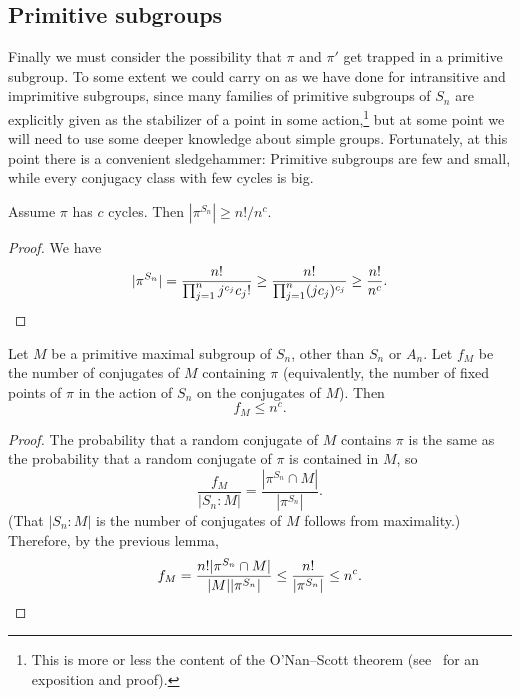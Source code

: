 \documentclass[ALCO,ThmDefs,Unicode,epreuves]{cedram}
\begin{document}
\subsection{Primitive subgroups} \label{subsec:primitive-subgroups}

Finally we must consider the possibility that $\pi$ and $\pi'$ get trapped in a primitive subgroup. To some extent we could carry on as we have done for intransitive and imprimitive subgroups, since many families of primitive subgroups of $S_n$ are explicitly given as the stabilizer of a point in some action,\footnote{This is more or less the content of the O'Nan--Scott theorem (see~\cite{lps-onan-scott-thm} for an exposition and proof).} but at some point we will need to use some deeper knowledge about simple groups. Fortunately, at this point there is a convenient sledgehammer: Primitive subgroups are few and small, while every conjugacy class with few cycles is big.

\begin{lemma}
Assume $\pi$ has $c$ cycles. Then $|\pi^{S_n}| \geq n!/n^c$.
\end{lemma}
\begin{proof}
We have
\[
 |\pi^{S_n}|
 = \frac{n!}{\prod_{j=1}^n j^{c_j} c_j!}
 \geq \frac{n!}{\prod_{j=1}^n (j c_j)^{c_j}}
 \geq \frac{n!}{n^c}. \qedhere
\]
\end{proof}

\begin{lemma} \label{lem:f_M-bound}
Let $M$ be a primitive maximal subgroup of $S_n$, other than $S_n$ or $A_n$. Let $f_M$ be the number of conjugates of $M$ containing $\pi$ (equivalently, the number of fixed points of $\pi$ in the action of $S_n$ on the conjugates of $M$). Then
\[
 f_M \leq n^c.
\]
\end{lemma}
\begin{proof}
The probability that a random conjugate of $M$ contains $\pi$ is the same as the probability that a random conjugate of $\pi$ is contained in $M$, so
\[
 \frac{f_M}{|S_n:M|} = \frac{|\pi^{S_n} \cap M|}{|\pi^{S_n}|}.
\]
(That $|S_n:M|$ is the number of conjugates of $M$ follows from maximality.) Therefore, by the previous lemma,
\[
 f_M = \frac{n! |\pi^{S_n} \cap M|}{|M| |\pi^{S_n}|} \leq \frac{n!}{|\pi^{S_n}|} \leq n^c.\qedhere
\]
\end{proof}
\end{document}
